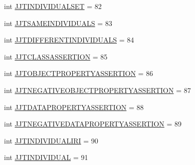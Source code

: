 \begin{DoxyCompactItemize}
\item 
int \hyperlink{interfaceorg_1_1coode_1_1owlapi_1_1functionalparser_1_1_o_w_l_functional_syntax_parser_tree_constants_af94f8a579cccf9186f1ba02fb5eab4e2}{J\-J\-T\-I\-N\-D\-I\-V\-I\-D\-U\-A\-L\-S\-E\-T} = 82
\item 
int \hyperlink{interfaceorg_1_1coode_1_1owlapi_1_1functionalparser_1_1_o_w_l_functional_syntax_parser_tree_constants_a0b882b236d28c3309c0faa9b73741ec3}{J\-J\-T\-S\-A\-M\-E\-I\-N\-D\-I\-V\-I\-D\-U\-A\-L\-S} = 83
\item 
int \hyperlink{interfaceorg_1_1coode_1_1owlapi_1_1functionalparser_1_1_o_w_l_functional_syntax_parser_tree_constants_aa72bc796529b7319e5ab3db684391ed2}{J\-J\-T\-D\-I\-F\-F\-E\-R\-E\-N\-T\-I\-N\-D\-I\-V\-I\-D\-U\-A\-L\-S} = 84
\item 
int \hyperlink{interfaceorg_1_1coode_1_1owlapi_1_1functionalparser_1_1_o_w_l_functional_syntax_parser_tree_constants_a9d516f95b25db5e522b77450418b4718}{J\-J\-T\-C\-L\-A\-S\-S\-A\-S\-S\-E\-R\-T\-I\-O\-N} = 85
\item 
int \hyperlink{interfaceorg_1_1coode_1_1owlapi_1_1functionalparser_1_1_o_w_l_functional_syntax_parser_tree_constants_a9ccc8ca73f2a17a56b8b7565ab72bcf3}{J\-J\-T\-O\-B\-J\-E\-C\-T\-P\-R\-O\-P\-E\-R\-T\-Y\-A\-S\-S\-E\-R\-T\-I\-O\-N} = 86
\item 
int \hyperlink{interfaceorg_1_1coode_1_1owlapi_1_1functionalparser_1_1_o_w_l_functional_syntax_parser_tree_constants_a1cf04f4b655d4122be96d4bc662b4009}{J\-J\-T\-N\-E\-G\-A\-T\-I\-V\-E\-O\-B\-J\-E\-C\-T\-P\-R\-O\-P\-E\-R\-T\-Y\-A\-S\-S\-E\-R\-T\-I\-O\-N} = 87
\item 
int \hyperlink{interfaceorg_1_1coode_1_1owlapi_1_1functionalparser_1_1_o_w_l_functional_syntax_parser_tree_constants_a52d2642a5ff4e1b6ecf71f9f0943ffd5}{J\-J\-T\-D\-A\-T\-A\-P\-R\-O\-P\-E\-R\-T\-Y\-A\-S\-S\-E\-R\-T\-I\-O\-N} = 88
\item 
int \hyperlink{interfaceorg_1_1coode_1_1owlapi_1_1functionalparser_1_1_o_w_l_functional_syntax_parser_tree_constants_a9118358b4d4aba87341c8e1ae1529437}{J\-J\-T\-N\-E\-G\-A\-T\-I\-V\-E\-D\-A\-T\-A\-P\-R\-O\-P\-E\-R\-T\-Y\-A\-S\-S\-E\-R\-T\-I\-O\-N} = 89
\item 
int \hyperlink{interfaceorg_1_1coode_1_1owlapi_1_1functionalparser_1_1_o_w_l_functional_syntax_parser_tree_constants_a34090b62a66cd305cb6f91e433c77429}{J\-J\-T\-I\-N\-D\-I\-V\-I\-D\-U\-A\-L\-I\-R\-I} = 90
\item 
int \hyperlink{interfaceorg_1_1coode_1_1owlapi_1_1functionalparser_1_1_o_w_l_functional_syntax_parser_tree_constants_adc222d8063ec49f95cf62e8f55835957}{J\-J\-T\-I\-N\-D\-I\-V\-I\-D\-U\-A\-L} = 91

\end{DoxyCompactItemize}
